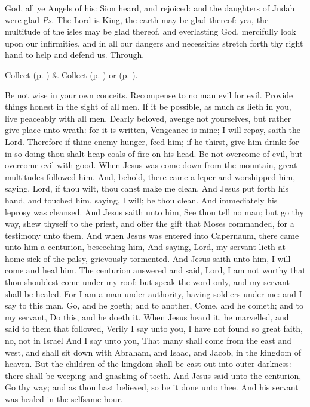 \introit
{} God, all ye Angels of his: Sion heard, and rejoiced: and the daughters of Judah were glad \textit{Ps.} The Lord is King, the earth may be glad thereof: yea, the multitude of the isles may be glad thereof.
\collect
{} and everlasting God, mercifully look upon our infirmities, and in all our dangers and necessities stretch forth thy right hand to help and defend us. Through.
\begin{rubric}
     Collect  (p. \pageref{SPMaryPostChristmas}) \&  Collect  (p. \pageref{SPAgainst}) or  (p. \pageref{SPChiefBishop}).
\end{rubric}
 Be not wise in your own conceits. Recompense to no man evil for evil. Provide things honest in the sight of all men. If it be possible, as much as lieth in you, live peaceably with all men. Dearly beloved, avenge not yourselves, but rather give place unto wrath: for it is written, Vengeance is mine; I will repay, saith the Lord. Therefore if thine enemy hunger, feed him; if he thirst, give him drink: for in so doing thou shalt heap coals of fire on his head. Be not overcome of evil, but overcome evil with good.
 When Jesus was come down from the mountain, great multitudes followed him. And, behold, there came a leper and worshipped him, saying, Lord, if thou wilt, thou canst make me clean. And Jesus put forth his hand, and touched him, saying, I will; be thou clean. And immediately his leprosy was cleansed. And Jesus saith unto him, See thou tell no man; but go thy way, shew thyself to the priest, and offer the gift that Moses commanded, for a testimony unto them. And when Jesus was entered into Capernaum, there came unto him a centurion, beseeching him, And saying, Lord, my servant lieth at home sick of the palsy, grievously tormented. And Jesus saith unto him, I will come and heal him. The centurion answered and said, Lord, I am not worthy that thou shouldest come under my roof: but speak the word only, and my servant shall be healed. For I am a man under authority, having soldiers under me: and I say to this man, Go, and he goeth; and to another, Come, and he cometh; and to my servant, Do this, and he doeth it. When Jesus heard it, he marvelled, and said to them that followed, Verily I say unto you, I have not found so great faith, no, not in Israel And I say unto you, That many shall come from the east and west, and shall sit down with Abraham, and Isaac, and Jacob, in the kingdom of heaven. But the children of the kingdom shall be cast out into outer darkness: there shall be weeping and gnashing of teeth. And Jesus said unto the centurion, Go thy way; and as thou hast believed, so be it done unto thee. And his servant was healed in the selfsame hour.

